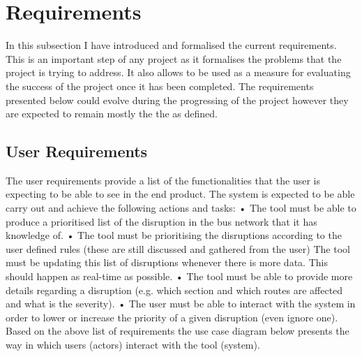 \chapter{Requirements}

In this subsection I have introduced and formalised the current requirements.
This is an important step of any project as it formalises the problems that the
project is trying to address. It also allows to be used as a measure for evaluating
the success of the project once it has been completed. The requirements
presented below could evolve during the progressing of the project however
they are expected to remain mostly the the as defined.
	\section{User Requirements}
	The user requirements provide a list of the functionalities that the user is
expecting to be able to see in the end product. The system is expected to be
able carry out and achieve the following actions and tasks:
• The tool must be able to produce a prioritised list of the disruption in
the bus network that it has knowledge of.
• The tool must be prioritising the disruptions according to the user defined
rules (these are still discussed and gathered from the user)
The tool must be updating this list of disruptions whenever there is more
data. This should happen as real-time as possible.
• The tool must be able to provide more details regarding a disruption (e.g.
which section and which routes are affected and what is the severity).
• The user must be able to interact with the system in order to lower or
increase the priority of a given disruption (even ignore one).
Based on the above list of requirements the use case diagram below presents
the way in which users (actors) interact with the tool (system).
